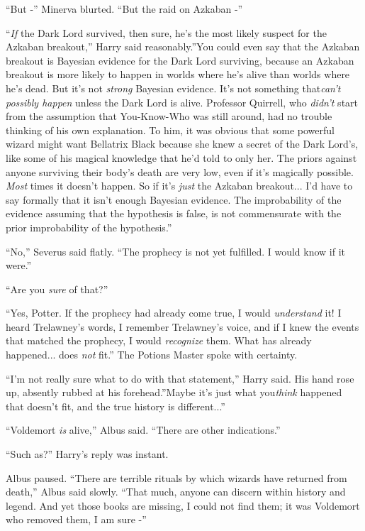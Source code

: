 ``But -'' Minerva blurted. ``But the raid on Azkaban -''

``\emph{If} the Dark Lord survived, then sure, he's the most likely
suspect for the Azkaban breakout,'' Harry said reasonably.''You could
even say that the Azkaban breakout is Bayesian evidence for the Dark
Lord surviving, because an Azkaban breakout is more likely to happen in
worlds where he's alive than worlds where he's dead. But it's not
\emph{strong} Bayesian evidence. It's not something that\emph{can't
possibly happen} unless the Dark Lord is alive. Professor Quirrell, who
\emph{didn't} start from the assumption that You-Know-Who was still
around, had no trouble thinking of his own explanation. To him, it was
obvious that some powerful wizard might want Bellatrix Black because she
knew a secret of the Dark Lord's, like some of his magical knowledge
that he'd told to only her. The priors against anyone surviving their
body's death are very low, even if it's magically possible. \emph{Most}
times it doesn't happen. So if it's \emph{just} the Azkaban
breakout... I'd have to say formally that it isn't enough Bayesian
evidence. The improbability of the evidence assuming that the hypothesis
is false, is not commensurate with the prior improbability of the
hypothesis.''

``No,'' Severus said flatly. ``The prophecy is not yet fulfilled. I
would know if it were.''

``Are you \emph{sure} of that?''

``Yes, Potter. If the prophecy had already come true, I would
\emph{understand} it! I heard Trelawney's words, I remember Trelawney's
voice, and if I knew the events that matched the prophecy, I would
\emph{recognize} them. What has already happened... does \emph{not}
fit.'' The Potions Master spoke with certainty.

``I'm not really sure what to do with that statement,'' Harry said. His
hand rose up, absently rubbed at his forehead.''Maybe it's just what
you\emph{think} happened that doesn't fit, and the true history is
different...''

``Voldemort \emph{is} alive,'' Albus said. ``There are other
indications.''

``Such as?'' Harry's reply was instant.

Albus paused. ``There are terrible rituals by which wizards have
returned from death,'' Albus said slowly. ``That much, anyone can
discern within history and legend. And yet those books are missing, I
could not find them; it was Voldemort who removed them, I am sure -''

